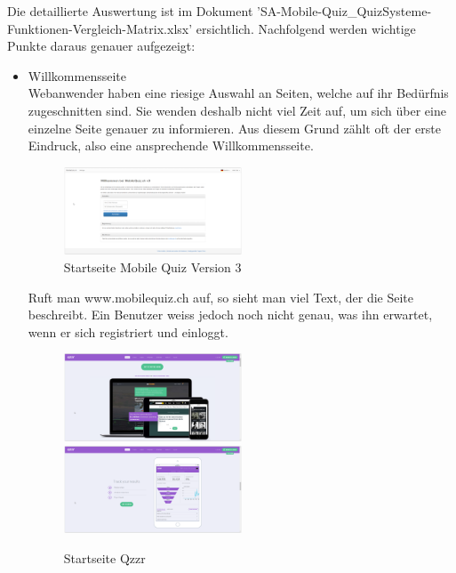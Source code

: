 	Die detaillierte Auswertung ist im Dokument 'SA-Mobile-Quiz\_QuizSysteme-Funktionen-Vergleich-Matrix.xlsx' ersichtlich. Nachfolgend werden wichtige Punkte daraus genauer aufgezeigt:
	
	\begin{itemize}
		\item Willkommensseite \\
		Webanwender haben eine riesige Auswahl an Seiten, welche auf ihr Bedürfnis zugeschnitten sind. Sie wenden deshalb nicht viel Zeit auf, um sich über eine einzelne Seite genauer zu informieren. Aus diesem Grund zählt oft der erste Eindruck, also eine ansprechende Willkommensseite. \\
		
		\begin{figure}[h]
			\centering
			\includegraphics[width=0.5\textwidth]{Images/MobileQuiz_StartPage.PNG}
			\caption{Startseite Mobile Quiz Version 3}
		\end{figure}
		
		Ruft man www.mobilequiz.ch auf, so sieht man viel Text, der die Seite beschreibt. Ein Benutzer weiss jedoch noch nicht genau, was ihn erwartet, wenn er sich registriert und einloggt.
		
		\begin{figure}[h]
			\centering
			\includegraphics[width=0.5\textwidth]{Images/Qzzr_StartPage.PNG}
			\includegraphics[width=0.5\textwidth]
			{Images/Qzzr_StartPage_Statistics.PNG}
			\caption{Startseite Qzzr}
		\end{figure}
				

\end{itemize}
